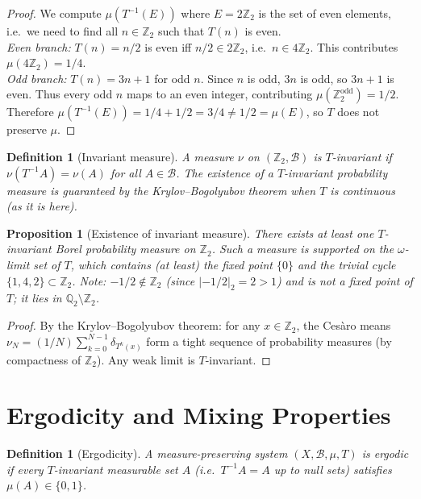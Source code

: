 \documentclass[12pt,a4paper]{article}
\newtheorem{proposition}[theorem]{Proposition}
\newtheorem{definition}[theorem]{Definition}
\begin{document}
\begin{proof}
We compute $\mu(T^{-1}(E))$ where $E = 2\mathbb{Z}_2$ is the set of even elements,
i.e.\ we need to find all $n \in \mathbb{Z}_2$ such that $T(n)$ is even.\\
\emph{Even branch:} $T(n) = n/2$ is even iff $n/2 \in 2\mathbb{Z}_2$, i.e.\ $n \in 4\mathbb{Z}_2$.
This contributes $\mu(4\mathbb{Z}_2) = 1/4$.\\
\emph{Odd branch:} $T(n) = 3n+1$ for odd $n$. Since $n$ is odd, $3n$ is odd, so $3n+1$ is even.
Thus every odd $n$ maps to an even integer, contributing $\mu(\mathbb{Z}_2^{\text{odd}}) = 1/2$.\\
Therefore $\mu(T^{-1}(E)) = 1/4 + 1/2 = 3/4 \neq 1/2 = \mu(E)$, so $T$ does not preserve $\mu$.
\end{proof}

\begin{definition}[Invariant measure]\label{def:invariant}
A measure $\nu$ on $(\mathbb{Z}_2, \mathcal{B})$ is \emph{$T$-invariant} if
$\nu(T^{-1}A) = \nu(A)$ for all $A \in \mathcal{B}$. The existence of a $T$-invariant
probability measure is guaranteed by the Krylov--Bogolyubov theorem when $T$ is continuous
(as it is here).
\end{definition}

\begin{proposition}[Existence of invariant measure]\label{prop:exist_inv}
There exists at least one $T$-invariant Borel probability measure on $\mathbb{Z}_2$.
Such a measure is supported on the $\omega$-limit set of $T$, which contains (at least)
the fixed point $\{0\}$ and the trivial cycle $\{1, 4, 2\} \subset \mathbb{Z}_2$.
Note: $-1/2 \notin \mathbb{Z}_2$ (since $|-1/2|_2 = 2 > 1$) and is not a fixed point
of $T$; it lies in $\mathbb{Q}_2 \setminus \mathbb{Z}_2$.
\end{proposition}

\begin{proof}
By the Krylov--Bogolyubov theorem: for any $x \in \mathbb{Z}_2$, the Cesàro means
$\nu_N = (1/N)\sum_{k=0}^{N-1} \delta_{T^k(x)}$ form a tight sequence of probability
measures (by compactness of $\mathbb{Z}_2$). Any weak limit is $T$-invariant.
\end{proof}

\section{Ergodicity and Mixing Properties}

\begin{definition}[Ergodicity]\label{def:ergodic}
A measure-preserving system $(X, \mathcal{B}, \mu, T)$ is \emph{ergodic} if every
$T$-invariant measurable set $A$ (i.e.\ $T^{-1}A = A$ up to null sets) satisfies
$\mu(A) \in \{0, 1\}$.
\end{definition}
\end{document}
